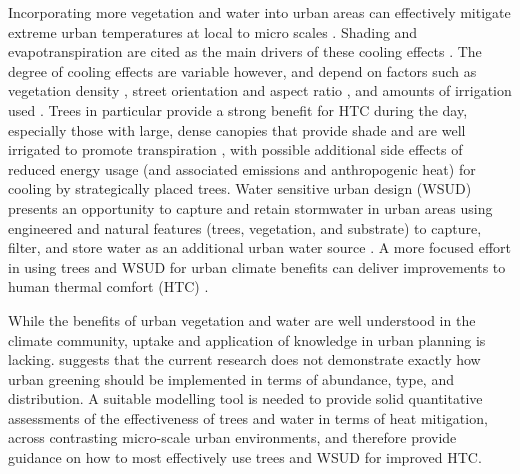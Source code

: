 \documentclass[final,3p,times,authoryear]{elsarticle}
\begin{document}
Incorporating more vegetation and water into urban areas can effectively mitigate extreme urban temperatures at local to micro scales \citep{Tsiros2010,Shashua-Bar2010a,Spangenberg2008,Coutts2012}. Shading and evapotranspiration are cited as the main drivers of these cooling effects \citep{Bowler2010}. The degree of cooling effects are variable however, and depend on factors such as vegetation density \citep{Hall2016,Bodnaruk2017}, street orientation and aspect ratio \citep{Thorsson2011,Ali-Toudert2006b}, and amounts of irrigation used \citep{Jenerette2011}. Trees in particular provide a strong benefit for HTC during the day, especially those with large, dense canopies that provide shade and are well irrigated to promote transpiration \citep{Coutts2015,Huang2008,Ylmaz2007,Shashua-Bar2000}, with possible additional side effects of reduced energy usage (and associated emissions and anthropogenic heat) for cooling \citep{Donovan2009,Rosenfeld1996,Simpson1993} by strategically placed trees. Water sensitive urban design (WSUD) presents an opportunity to capture and retain stormwater in urban areas using engineered and natural features (trees, vegetation, and substrate) to capture, filter, and store water as an additional urban water source \citep{Wong2009}. A more focused effort in using trees and WSUD for urban climate benefits can deliver improvements to human thermal comfort (HTC) \citep{Coutts2012}. 



While the benefits of urban vegetation and water are well understood in the climate community, uptake and application of knowledge in urban planning is lacking. \cite{Bowler2010} suggests that the current research does not demonstrate exactly how urban greening should be implemented in terms of abundance, type, and distribution.  A suitable modelling tool is needed to provide solid quantitative assessments of the effectiveness of trees and water in terms of heat mitigation, across contrasting micro-scale urban environments, and therefore provide guidance on how to most effectively use trees and WSUD for improved HTC. 
\end{document}
